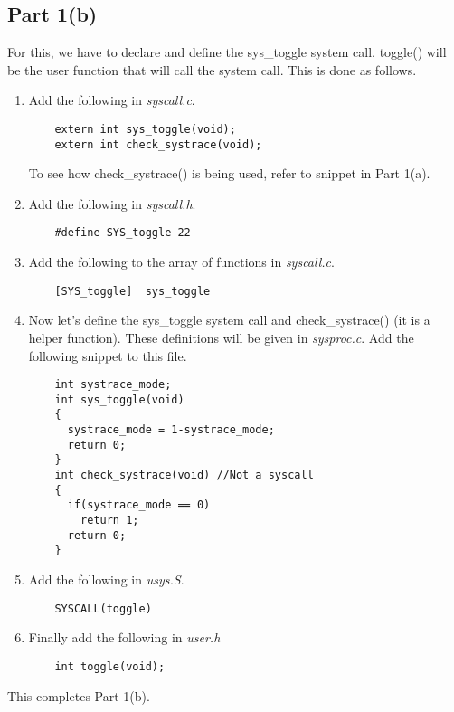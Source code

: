 \documentclass[a4paper]{article}
\begin{document}
\subsection*{Part 1(b)}
For this, we have to declare and define the sys\_toggle system call. toggle() will be the user function that will call the system call. This is done as follows.
\begin{enumerate}
	\item Add the following in \textit{syscall.c}.
    \begin{lstlisting}
    extern int sys_toggle(void);
    extern int check_systrace(void);
    \end{lstlisting}
    To see how check\_systrace() is being used, refer to snippet in Part 1(a).
    \item Add the following in \textit{syscall.h}.
    \begin{lstlisting}
    #define SYS_toggle 22
    \end{lstlisting}
    \item Add the following to the array of functions in \textit{syscall.c}.
    \begin{lstlisting}
    [SYS_toggle]  sys_toggle
    \end{lstlisting}
    \item Now let's define the sys\_toggle system call and check\_systrace() (it is a helper function). These definitions will be given in \textit{sysproc.c}. Add the following snippet to this file.
    \newpage
    \begin{lstlisting}
    int systrace_mode;
    int sys_toggle(void)
    {
      systrace_mode = 1-systrace_mode;
      return 0;
    }
    int check_systrace(void) //Not a syscall
    {
      if(systrace_mode == 0)
        return 1;
      return 0;
    }
    \end{lstlisting}
    \item Add the following in \textit{usys.S}.
    \begin{lstlisting}
    SYSCALL(toggle)
    \end{lstlisting}
    \item Finally add the following in \textit{user.h}
    \begin{lstlisting}
    int toggle(void);
    \end{lstlisting}
\end{enumerate}

This completes Part 1(b).
\end{document}
